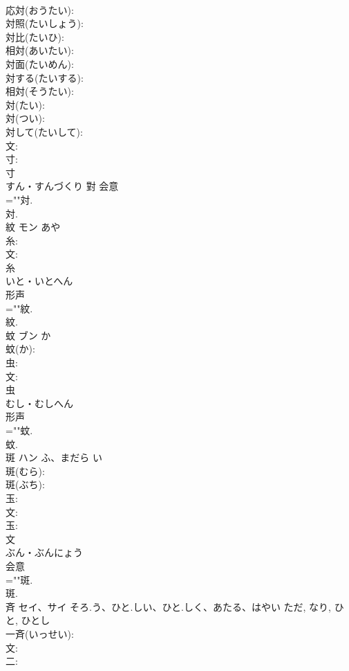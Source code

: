\documentclass[8pt]{extreport}
\begin{document}
\begin{CJK}{UTF8}{min}
\\	応対(おうたい): 
\\	対照(たいしょう): 
\\	対比(たいひ): 
\\	相対(あいたい): 
\\	対面(たいめん): 
\\	対する(たいする): 
\\	相対(そうたい): 
\\	対(たい): 
\\	対(つい): 
\\	対して(たいして): 
\\	文: 
\\	寸: 
\\	寸	
\\	すん・すんづくり	對	会意 
\\	=""対.
\\	対.
\\	紋	モン		あや	
\\	糸: 
\\	文: 
\\	糸	
\\	いと・いとへん	
\\	形声 
\\	=""紋.
\\	紋.
\\	蚊	ブン	か		
\\	蚊(か): 
\\	虫: 
\\	文: 
\\	虫	
\\	むし・むしへん	
\\	形声 
\\	=""蚊.
\\	蚊.
\\	斑	ハン	ふ、まだら	い	
\\	斑(むら): 
\\	斑(ぶち): 
\\	玉: 
\\	文: 
\\	玉: 
\\	文	
\\	ぶん・ぶんにょう	
\\	会意 
\\	=""斑.
\\	斑.
\\	斉	セイ、サイ	そろ.う、ひと.しい、ひと.しく、あたる、はやい	ただ, なり, ひと, ひとし	
\\	一斉(いっせい): 
\\	文: 
\\	二: 

\end{CJK}
\end{document}
